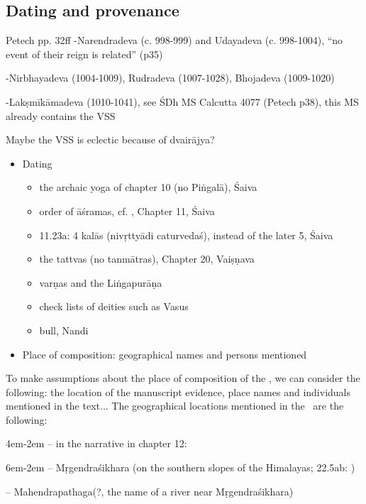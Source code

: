 \documentclass[11pt]{book}
\begin{document}
\subsection{Dating and provenance}

Petech pp. 32ff
-Narendradeva (c. 998-999) and Udayadeva (c. 998-1004), “no event of their reign is related” (p35)

-Nirbhayadeva (1004-1009), Rudradeva (1007-1028), Bhojadeva (1009-1020)

-Lakṣmīkāmadeva (1010-1041), see ŚDh MS Calcutta 4077 (Petech p38), this MS already contains the VSS

Maybe the VSS is eclectic because of dvairājya?


\begin{itemize}

\item
  Dating

  \begin{itemize}
  
  \item
    the archaic yoga of chapter 10 (no Piṅgalā), Śaiva
  \item
    order of āśramas, cf. , Chapter 11, Śaiva
  \item
    11.23a: 4 kalās (nivṛttyādi caturvedaś), instead of the later 5,
    Śaiva
  \item
    the tattvas (no tanmātras), Chapter 20, Vaiṣṇava
  \item
    varṇas and the Liṅgapurāṇa
  \item
    check lists of deities such as Vasus
  \item
bull, Nandi
  \end{itemize}
\item
  Place of composition: geographical names and persons mentioned
\end{itemize}

To make assumptions about the place of composition of the \Vss,
we can consider the following: the location of the manuscript 
evidence, place names and individuals mentioned in the text... 
The geographical locations 
mentioned in the \Vss\ are the following:

\leftskip4em\parindent-2em
-- in the narrative in chapter 12:

\leftskip6em\parindent-2em
-- Mṛgendraśikhara (on the southern slopes of
					the Himalayas; 22.5ab: 
		 			)
		 			
-- Mahendrapathaga(?, the name of a river near Mṛgendraśikhara)
\end{document}
